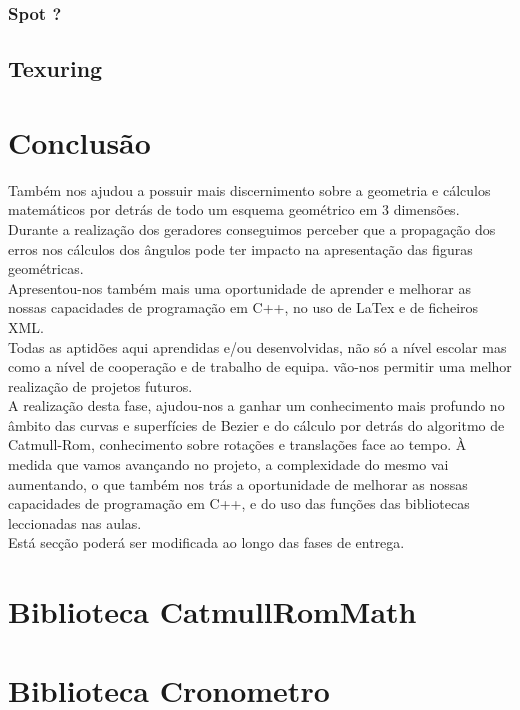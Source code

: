 \documentclass{article}
\begin{document}
\subsubsection{Spot ?}

\subsection{Texuring}


\section{Conclusão}
Também nos ajudou a possuir mais discernimento sobre a geometria e cálculos matemáticos por detrás de todo um esquema geométrico em 3 dimensões.\\
Durante a realização dos geradores conseguimos perceber que a propagação dos erros nos cálculos dos ângulos pode ter impacto na apresentação das figuras geométricas.\\
Apresentou-nos também mais uma oportunidade de aprender e melhorar as nossas capacidades de programação em C++, no uso de LaTex e de ficheiros XML.\\
Todas as aptidões aqui aprendidas e/ou desenvolvidas, não só a nível escolar mas como a nível de cooperação e  de trabalho de equipa. vão-nos permitir uma melhor realização de projetos futuros.\\
A realização desta fase, ajudou-nos a ganhar um conhecimento mais profundo no âmbito das curvas e superfícies de Bezier e do cálculo por detrás do algoritmo de Catmull-Rom, conhecimento sobre rotações e translações face ao tempo. À medida que vamos avançando no projeto, a complexidade do mesmo vai aumentando, o que também nos trás a oportunidade de melhorar as nossas capacidades de programação em C++, e do uso das funções das bibliotecas leccionadas nas aulas.\\
Está secção poderá ser modificada ao longo das fases de entrega.\\

\newpage


\appendix

\section{Biblioteca CatmullRomMath}


\newpage

\section{Biblioteca Cronometro}


\newpage
\end{document}
